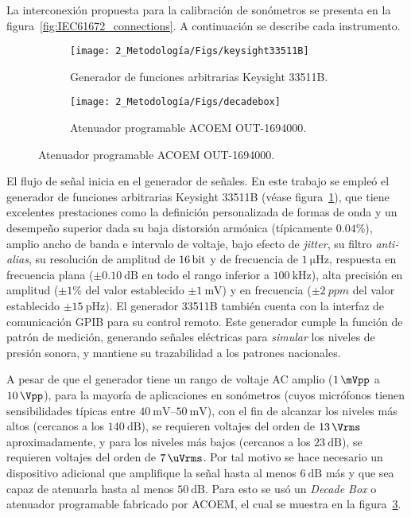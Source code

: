 La interconexión propuesta para la calibración de sonómetros se presenta en la figura~\ref{fig:IEC61672_connections}.
A continuación se describe cada instrumento.
%
\clearpage

\begin{figure}[!h]
    \caption{Instrumentos utilizados en la calibración periódica de sonómetros.}
    \centering
    \begin{subfigure}[t]{0.49\textwidth}
        \centering
        \texttt{[image: 2\_Metodología/Figs/keysight33511B]}
        \caption{Generador de funciones arbitrarias Keysight 33511B.}
        \label{fig:keysight_33511B}
    \end{subfigure}
    \hfill
    \begin{subfigure}[t]{0.49\textwidth}
        \centering
        \texttt{[image: 2\_Metodología/Figs/decadebox]}
        \caption{Atenuador programable ACOEM OUT-1694000.}
        \label{fig:decade_box}
    \end{subfigure}
\end{figure}
%
El flujo de señal inicia en el generador de señales.
En este trabajo se empleó el generador de funciones arbitrarias Keysight 33511B (véase figura~\ref{fig:keysight_33511B}), que tiene excelentes prestaciones como la definición personalizada de formas de onda y un desempeño superior dada su baja distorsión armónica (típicamente $\num{0.04}\%$), amplio ancho de banda e intervalo de voltaje, bajo efecto de \emph{jitter}, su filtro \emph{anti-alias}, su resolución de amplitud de $\qty{16}{\bit}$ y de frecuencia de $\qty{1}{\micro\Hz}$, respuesta en frecuencia plana ($\pm\qty{0.10}{\dB}$ en todo el rango inferior a $\qty{100}{\kHz}$), alta precisión en amplitud ($\pm1\%$ del valor establecido $\pm\qty{1}{\mV}$) y en frecuencia ($\pm\qty{2}{ppm}$ del valor establecido $\pm\qty{15}{\pico\Hz}$).
El generador 33511B también cuenta con la interfaz de comunicación GPIB para su control remoto.
Este generador cumple la función de patrón de medición, generando señales eléctricas para \emph{simular} los niveles de presión sonora, y mantiene su trazabilidad a los patrones nacionales.

A pesar de que el generador tiene un rango de voltaje AC amplio ($\qty{1}{\mVpp}$ a $\qty{10}{\Vpp}$), para la mayoría de aplicaciones en sonómetros (cuyos micrófonos tienen sensibilidades típicas entre $\qtyrange{40}{50}{\mV}$), con el fin de alcanzar los niveles más altos (cercanos a los $\qty{140}{\dB}$), se requieren voltajes del orden de $\qty{13}{\Vrms}$ aproximadamente, y para los niveles más bajos (cercanos a los $\qty{23}{\dB}$), se requieren voltajes del orden de $\qty{7}{\uVrms}$.
Por tal motivo se hace necesario un dispositivo adicional que amplifique la señal hasta al menos $\qty{6}{\dB}$ más y que sea capaz de atenuarla hasta al menos $\qty{50}{\dB}$.
Para esto se usó un \emph{Decade Box} o atenuador programable fabricado por ACOEM, el cual se muestra en la figura~\ref{fig:decade_box}.

